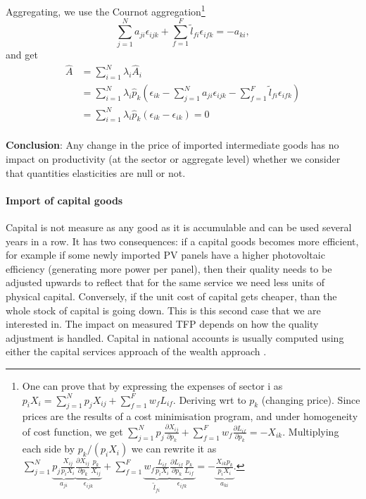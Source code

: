 \documentclass[11pt]{article}
\begin{document}
Aggregating, we use the Cournot aggregation\footnote{
One can prove that by expressing the expenses of sector i as $p_iX_i=\sum_{j=1}^N p_j X_{ij} +\sum_{f=1}^F  w_f L_{if}  $. Deriving wrt to $p_k$ (changing price). Since prices are the results of a cost minimisation program, and under homogeneity of cost function, we get
$\sum_{j=1}^N p_j \frac{\partial X_{ij}}{\partial p_k} +\sum_{f=1}^F  w_f\frac{\partial L_{if}}{\partial p_k}=-X_{ik}$. Multiplying each side by $p_k/(p_iX_i)$ we can rewrite it as
$\sum_{j=1}^N \underbrace{p_j \frac{X_{ij}}{p_iX_i}}_{a_{ji}} \underbrace{\frac{\partial X_{ij}}{\partial p_k}\frac{p_k}{X_{ij}}}_{\epsilon_{ijk}} +\sum_{f=1}^F  \underbrace{w_f \frac{L_{if}}{p_iX_i}}_{\tilde{l}_{fi}} \underbrace{\frac{\partial L_{if}}{\partial p_k}\frac{p_k}{L_{if}}}_{\epsilon_{ifk}}=-\underbrace{\frac{X_{ik}p_k}{p_iX_i}}_{a_{ki}}$.
} 
\begin{equation*}
    \sum_{j=1}^N a_{ji} \epsilon_{ijk} +\sum_{f=1}^F  \tilde{l}_{fi}\epsilon_{ifk} = - a_{ki},
\end{equation*}
and get
\begin{equation}
\label{eq_agg_prod_}
    \begin{aligned}
    \hat{A}&=\sum_{i=1}^N \lambda_i \hat{A}_i\\
    &=\sum_{i=1}^N \lambda_i  \hat{p}_{k}\left(
    \epsilon_{ik}-  \sum_{j=1}^N  a_{ji} \epsilon_{ijk}- \sum_{f=1}^F  \tilde{l}_{fi}\epsilon_{ifk}
    \right)\\
      &=\sum_{i=1}^N \lambda_i  \hat{p}_{k}\left(
    \epsilon_{ik}-\epsilon_{ik}
    \right)=0\\
\end{aligned}
\end{equation}




\textbf{Conclusion}: Any change in the price of imported intermediate goods has no impact on productivity (at the sector or aggregate level) whether we consider that quantities elasticities are null or not.

\paragraph{Import of capital goods} 

Capital is not measure as any good as it is accumulable and can be used several years in a row. It has two consequences: if a capital goods becomes more efficient, for example if some newly imported PV panels have a higher photovoltaic efficiency (generating more power per panel), then their quality needs to be adjusted upwards to reflect that for the same service we need less units of physical capital. Conversely, if the unit cost of capital gets cheaper, than the whole stock of capital is going down. This is this second case that we are interested in. The impact on measured TFP depends on how the quality adjustment is handled. Capital in national accounts is usually computed using either the capital services approach of the wealth approach \cite{oulton_measuring_2001}.
\end{document}
